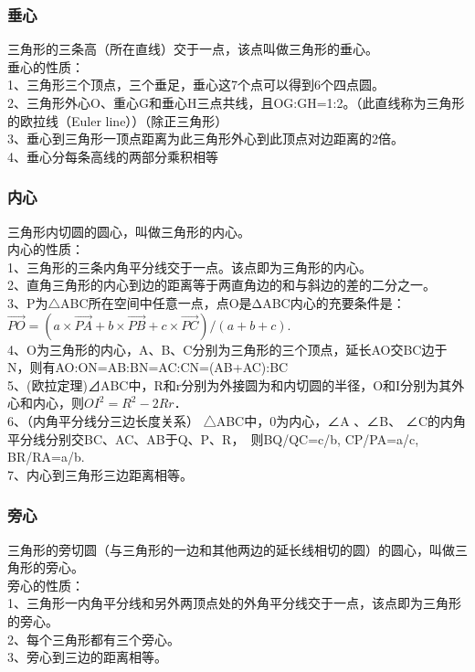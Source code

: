 \documentclass[UTF8]{ctexart}
\begin{document}
			\subsubsection{垂心}
				三角形的三条高（所在直线）交于一点，该点叫做三角形的垂心。\\
				垂心的性质：\\
				1、三角形三个顶点，三个垂足，垂心这7个点可以得到6个四点圆。\\
				2、三角形外心O、重心G和垂心H三点共线，且OG:GH=1:2。（此直线称为三角形的欧拉线（Euler line））（除正三角形）\\
				3、垂心到三角形一顶点距离为此三角形外心到此顶点对边距离的2倍。\\
				4、垂心分每条高线的两部分乘积相等
			\subsubsection{内心}
				三角形内切圆的圆心，叫做三角形的内心。\\
				内心的性质：\\
				1、三角形的三条内角平分线交于一点。该点即为三角形的内心。\\
				2、直角三角形的内心到边的距离等于两直角边的和与斜边的差的二分之一。\\
				3、P为$\bigtriangleup$ABC所在空间中任意一点，点O是ΔABC内心的充要条件是：$\overrightarrow{PO}=(a×\overrightarrow{PA} +b×\overrightarrow{PB} +c×\overrightarrow{PC} )/(a+b+c)$.\\
				4、O为三角形的内心，A、B、C分别为三角形的三个顶点，延长AO交BC边于N，则有AO:ON=AB:BN=AC:CN=(AB+AC):BC\\
				5、(欧拉定理)⊿ABC中，R和r分别为外接圆为和内切圆的半径，O和I分别为其外心和内心，则$OI^2=R^2-2Rr$．\\
				6、（内角平分线分三边长度关系）
				△ABC中，0为内心，∠A 、∠B、 ∠C的内角平分线分别交BC、AC、AB于Q、P、R，　则BQ/QC=c/b, CP/PA=a/c, BR/RA=a/b.\\
				7、内心到三角形三边距离相等。
			\subsubsection{旁心}
				三角形的旁切圆（与三角形的一边和其他两边的延长线相切的圆）的圆心，叫做三角形的旁心。\\
				旁心的性质：\\
				1、三角形一内角平分线和另外两顶点处的外角平分线交于一点，该点即为三角形的旁心。\\
				2、每个三角形都有三个旁心。\\
				3、旁心到三边的距离相等。\\
\end{document}
